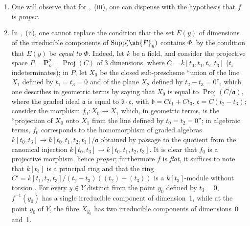 \begin{remarks}[12.2.3]
\label{IV.12.2.3}
\begin{enumerate}[label=(\roman*)]
  \item One will observe that for ,~(iii), one can dispense with the hypothesis that $f$ is \emph{proper}.

  \item In ,~(ii), one cannot replace the condition that the set $E(y)$ of dimensions of the irreducible components of $\operatorname{Supp}(\sh{F}_y)$ contains $\Phi$, by the condition that $E(y)$ be \emph{equal to} $\Phi$.
Indeed, let $k$ be a field, and consider the projective space $P=\mathbf{P}_k^2=\operatorname{Proj}(C)$ of $3$ dimensions, where $C=k[t_0,t_1,t_2,t_3]$ ($t_i$ indeterminates); in $P$, let $X_0$ be the closed sub-prescheme ``union of the line $X_1$ defined by $t_1=t_3=0$ and of the plane $X_2$ defined by $t_2-t_3=0$'', which one describes in geometric terms by saying that $X_0$ is equal to $\operatorname{Proj}(C/\mathfrak{a})$, where the graded ideal $\mathfrak{a}$ is equal to $\mathfrak{b}\cdot\mathfrak{c}$, with $\mathfrak{b}=Ct_1+Ct_3$, $\mathfrak{c}=C(t_2-t_3)$; consider the morphism $f_0:X_0\to X_1$ which, in geometric terms, is the ``projection of $X_0$ onto $X_1$ from the line defined by $t_0=t_2=0$''; in algebraic terms, $f_0$ corresponds to the homomorphism of graded algebras $k[t_0,t_3]\to k[t_0,t_1,t_2,t_3]/\mathfrak{a}$ obtained by passage to the quotient from the canonical injection $k[t_0,t_3]\to k[t_0,t_1,t_2,t_3]$.
It is clear that $f_0$ is a projective morphism, hence \emph{proper}; furthermore $f$ is \emph{flat}, it suffices to note that $k[t_3]$ is a principal ring and that the ring $C'=k[t_1,t_2,t_3]/(t_2-t_3)((t_2)+( t_3))$ is a $k[t_3]$-module without torsion .
For every $y\in Y$ distinct from the point $y_0$ defined by $t_3=0$, $f^{-1}(y_0)$ has a single irreducible component of dimension~1, while at the point $y_0$ of $Y$, the fibre $X_{y_0}$ has two irreducible components of dimensions~0 and~1.


\end{enumerate}
\end{remarks}
